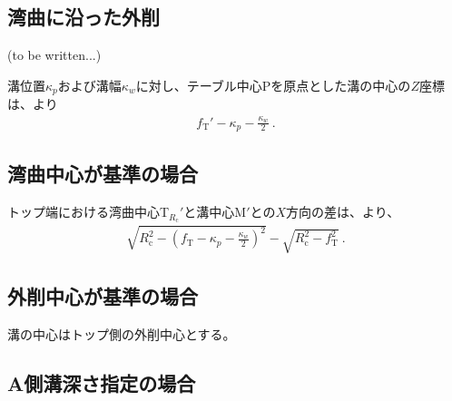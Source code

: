 \subsection{湾曲に沿った外削\TBW}
(to be written...)


\clearpage
溝位置$\kappa_p$および溝幅$\kappa_w$に対し、テーブル中心Pを原点とした溝の中心の$Z$座標は、より
\begin{align*}
  f_\mathrm T'-\kappa_p-\frac{\kappa_w}2\ .
\end{align*}

\subsection{湾曲中心が基準の場合}
トップ端における湾曲中心T$_{R_\mathrm c}'$と溝中心M$'$との$X$方向の差は、より、
\begin{align*}
  \sqrt{R_\mathrm c^2-\left(f_\mathrm T-\kappa_p-\frac{\kappa_w}2\right)^{\!2}}
  -\sqrt{R_\mathrm c^2-f_\mathrm T^2}\ .
\end{align*}


\subsection{外削中心が基準の場合}
溝の中心はトップ側の外削中心とする。


\subsection{A側溝深さ指定の場合}

